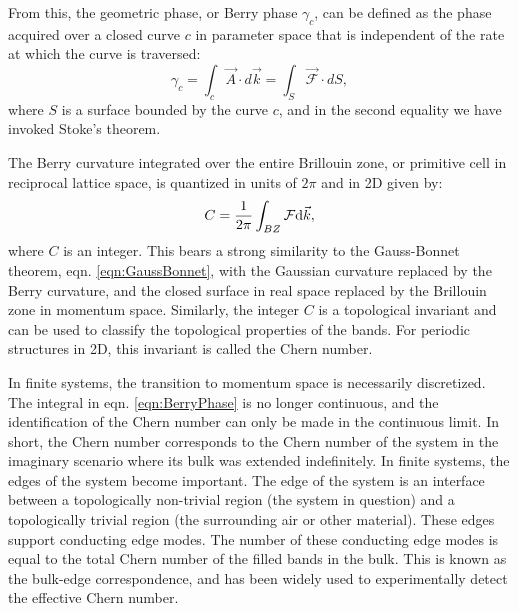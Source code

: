 From this, the geometric phase, or Berry phase $\gamma_c$\cite{Berry1984}, can be defined as the phase acquired over a closed curve $c$  in parameter space that is independent of the rate at which the curve is traversed:
\begin{equation}
\gamma_c = \int_c \vec{A}\cdot d\vec{k} = \int_S \vec{\mathcal{F}}\cdot dS,
\label{eqn:BerryPhase}
\end{equation}
where $S$ is a surface bounded by the  curve $c$, and in the second equality we have invoked Stoke's theorem. 

The Berry curvature integrated over the entire Brillouin zone, or primitive cell in reciprocal lattice space, is quantized in units of $2\pi$ and in 2D given by:
\begin{equation}
C=\frac{1}{2\pi} \int_{BZ} \mathcal{F}{\rm d}\vec{k},
\label{eqn:ChernFromBerryCurvature}
\end{equation}
where $C$ is an integer\cite{Chern,Alty1995}. This bears a strong similarity to the Gauss-Bonnet theorem, eqn. \ref{eqn:GaussBonnet}, with the Gaussian curvature replaced by the Berry curvature, and the closed surface in real space replaced by the Brillouin zone in momentum space. Similarly, the integer $C$ is a topological invariant and can be used to classify the topological properties of the bands. For periodic structures in 2D, this invariant is called the Chern number. 

In finite systems, the transition to momentum space is necessarily discretized. The integral in eqn. \ref{eqn:BerryPhase} is no longer continuous, and the identification of the Chern number can only be made in the continuous limit. In short, the Chern number corresponds to the Chern number of the system in the imaginary scenario where its bulk was extended indefinitely. In finite systems, the edges of the system become important. The edge of the system is an interface between a topologically non-trivial region (the system in question) and a topologically trivial region (the surrounding air or other material). These edges support conducting edge modes.  The number of these conducting edge modes is equal to the total Chern number of the filled bands in the bulk. This is known as the bulk-edge correspondence\cite{Thouless1982,Datta1995}, and has been widely used to experimentally detect the effective Chern number. 


